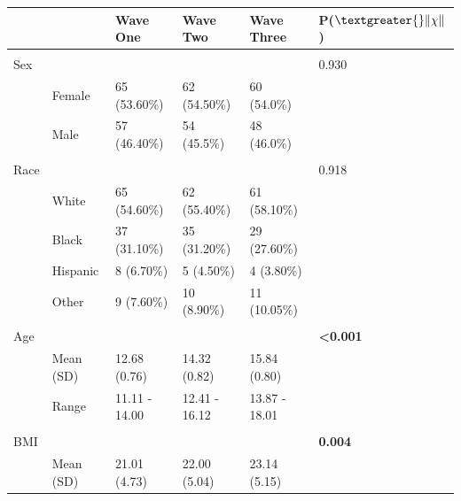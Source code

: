 \documentclass[utf8]{stylesheet}
\begin{document}
\begin{table}[h!]
\begin{tabular}{llllll}
                    &                 & Wave One         & Wave Two         & Wave Three       & P($\textgreater{}\|\chi\|$)       \\ \hline \\
Sex                 &                 &                  &                  &                  & 0.930                    \\
                    & Female          & 65 (53.60\%)     & 62 (54.50\%)     & 60 (54.0\%)      &                          \\
                    & Male            & 57 (46.40\%)     & 54 (45.5\%)      & 48 (46.0\%)      &                          \\ \hline \\
Race                &                 &                  &                  &                  & 0.918                    \\
                    & White           & 65 (54.60\%)      & 62 (55.40\%)      & 61 (58.10\%)      &                          \\
                    & Black           & 37 (31.10\%)      & 35 (31.20\%)      & 29 (27.60\%)      &                          \\
                    & Hispanic        & 8 (6.70\%)        & 5 (4.50\%)        & 4 (3.80\%)        &                          \\
                    & Other           & 9 (7.60\%)       & 10 (8.90\%)       & 11 (10.05\%)      &                          \\ \hline \\
Age        &                 &                  &                  &                  & \textbf{\textless 0.001} \\
                    & Mean (SD)       & 12.68 (0.76)   & 14.32 (0.82)   & 15.84 (0.80)   &                          \\
                    & Range           & 11.11 - 14.00    & 12.41 - 16.12     & 13.87 - 18.01    &                          \\       \hline \\              
BMI        &                 &                  &                  &                  & \textbf{0.004}           \\
                    & Mean (SD)       & 21.01 (4.73)   & 22.00 (5.04)   & 23.14 (5.15)   &                          \\

\end{tabular}
\end{table}
\end{document}
